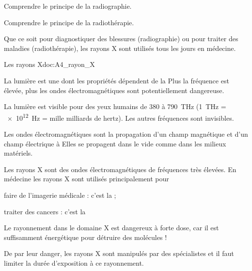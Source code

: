 \teteTermStssImag
\vspace*{-36pt}


\begin{objectifs}
  \item Comprendre le principe de la radiographie.
  \item Comprendre le principe de la radiothérapie.
\end{objectifs}

\begin{contexte}
  Que ce soit pour diagnostiquer des blessures (radiographie) ou pour traiter des maladies (radiothérapie), les rayons X sont utilisés tous les jours en médecine.

\end{contexte}


\begin{doc}{Les rayons X}{doc:A4_rayon_X}
  \begin{center}  
  \end{center}
  
  La lumière est une  dont les propriétés dépendent de la 
  Plus la fréquence est élevée, plus les ondes électromagnétiques sont potentiellement dangereuse.
  
  La lumière est visible pour des yeux humains de 380 à \qty{790}{\tera\hertz} (\qty{1}{\tera\hertz} = \qty{e12}{\hertz} = mille milliards de hertz).
  Les autres fréquences sont invisibles.

  Les ondes électromagnétiques sont la propagation d'un champ magnétique et d'un champ électrique à 
  Elles se propagent dans le vide comme dans les milieux matériels.
  
  \begin{importants}
    Les rayons X sont des ondes électromagnétiques de fréquences très élevées.
    En médecine les rayons X sont utilisés principalement pour
    \begin{listePoints}  
      \item faire de l'imagerie médicale : c'est la  ;
      \item traiter des cancers : c'est la 
    \end{listePoints}
  \end{importants}

  Le rayonnement dans le domaine X est dangereux à forte dose, car il est suffisamment énergétique pour détruire des molécules !

  De par leur danger, les rayons X sont manipulés par des spécialistes et il faut limiter la durée d'exposition à ce rayonnement.
\end{doc}

